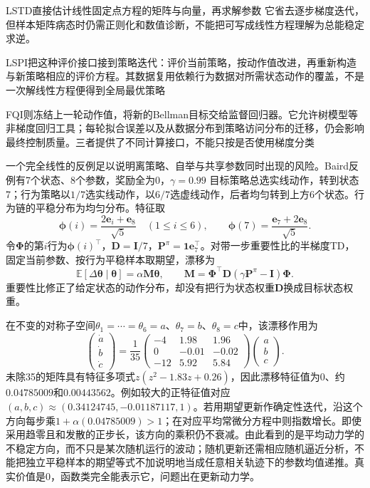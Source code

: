 LSTD直接估计线性固定点方程的矩阵与向量，再求解参数
它省去逐步梯度迭代，但样本矩阵病态时仍需正则化和数值诊断，不能把可写成线性方程理解为总能稳定求逆。

LSPI把这种评价接口接到策略迭代：评价当前策略，按动作值改进，再重新构造与新策略相应的评价方程。其数据复用依赖行为数据对所需状态动作的覆盖，不是一次解线性方程便得到全局最优策略

FQI则冻结上一轮动作值，将新的Bellman目标交给监督回归器。它允许树模型等非梯度回归工具；每轮拟合误差以及从数据分布到策略访问分布的迁移，仍会影响最终控制质量。三者提供了不同计算接口，不能只按是否使用梯度分类

一个完全线性的反例足以说明离策略、自举与共享参数同时出现的风险。Baird反例有7个状态、8个参数，奖励全为0，$\gamma=0.99$
目标策略总选实线动作，转到状态7；行为策略以$1/7$选实线动作，以$6/7$选虚线动作，后者均匀转到上方6个状态。行为链的平稳分布为均匀分布。特征取
\[
  \bm{\phi}(i)=\frac{2\bm{e}_i+\bm{e}_8}{\sqrt5}\quad(1\leq i\leq6),
  \qquad
  \bm{\phi}(7)=\frac{\bm{e}_7+2\bm{e}_8}{\sqrt5}.
\]
令$\bm{\Phi}$的第$i$行为$\bm{\phi}(i)^\top$，$\bm{D}=\bm{I}/7$，$\bm{P}^\pi=\bm{1}\bm{e}_7^\top$。对带一步重要性比的半梯度TD，固定当前参数、按行为平稳样本取期望，漂移为
\begin{equation}
  \mathbb E[\Delta\bm{\theta}\mid\bm{\theta}]
     =\alpha\bm{M}\bm{\theta},\qquad
  \bm{M}=\bm{\Phi}^\top\bm{D}
                   (\gamma\bm{P}^\pi-\bm{I})\bm{\Phi}.
  \label{eq:rl-learning-baird-matrix}
\end{equation}
重要性比修正了给定状态的动作分布，却没有把行为状态权重$\bm{D}$换成目标状态权重。

在不变的对称子空间$\theta_1=\cdots=\theta_6=a$、$\theta_7=b$、$\theta_8=c$中，该漂移作用为
\begin{equation}
  \begin{pmatrix}\dot a\\\dot b\\\dot c\end{pmatrix}
  =
  \frac1{35}
  \begin{pmatrix}
    -4 & 1.98 & 1.96\\
     0 & -0.01 & -0.02\\
    -12 & 5.92 & 5.84
  \end{pmatrix}
  \begin{pmatrix}a\\b\\c\end{pmatrix}.
  \label{eq:rl-learning-baird-reduced}
\end{equation}
未除35的矩阵具有特征多项式$z(z^2-1.83z+0.26)$，因此漂移特征值为$0$、约$0.04785009$和$0.00443562$。例如较大的正特征值对应$(a,b,c)\approx(0.34124745,-0.01187117,1)$。若用期望更新作确定性迭代，沿这个方向每步乘$1+\alpha(0.04785009)>1$；在对应平均常微分方程中则指数增长。即使采用趋零且和发散的正步长，该方向的乘积仍不衰减。由此看到的是平均动力学的不稳定方向，而不只是某次随机运行的波动；随机更新还需相应随机逼近分析，不能把独立平稳样本的期望等式不加说明地当成任意相关轨迹下的参数均值递推。真实价值是0，函数类完全能表示它，问题出在更新动力学。

